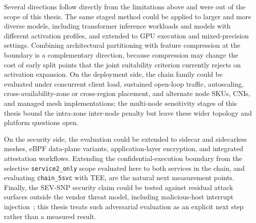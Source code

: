 Several directions follow directly from the limitations above and
were out of the scope of this thesis. The same staged method could
be applied to larger and more diverse models, including transformer
inference workloads and models with different activation profiles,
and extended to GPU execution and mixed-precision settings. Combining
architectural partitioning with feature compression at the boundary
is a complementary direction, because compression may change the
cost of early split points that the joint suitability criterion
currently rejects on activation expansion. On the deployment side,
the chain family could be evaluated under concurrent client load,
sustained open-loop traffic, autoscaling, cross-availability-zone or
cross-region placement, and alternate node SKUs, CNIs, and managed
mesh implementations; the multi-node sensitivity stages of this
thesis bound the intra-zone inter-node penalty but leave these
wider topology and platform questions open.

On the security side, the evaluation could be extended to sidecar
and sidecarless meshes, eBPF data-plane variants, application-layer
encryption, and integrated attestation workflows. Extending the
confidential-execution boundary from the selective
\texttt{service2\_only} scope evaluated here to both services in the
chain, and evaluating \texttt{chain\_5svc} with TEE, are the natural
next measurement points. Finally, the SEV-SNP security claim could
be tested against residual attack surfaces outside the vendor threat
model, including malicious-host interrupt
injection~\cite{schluter2024_heckler}; this thesis treats such
adversarial evaluation as an explicit next step rather than a
measured result.
